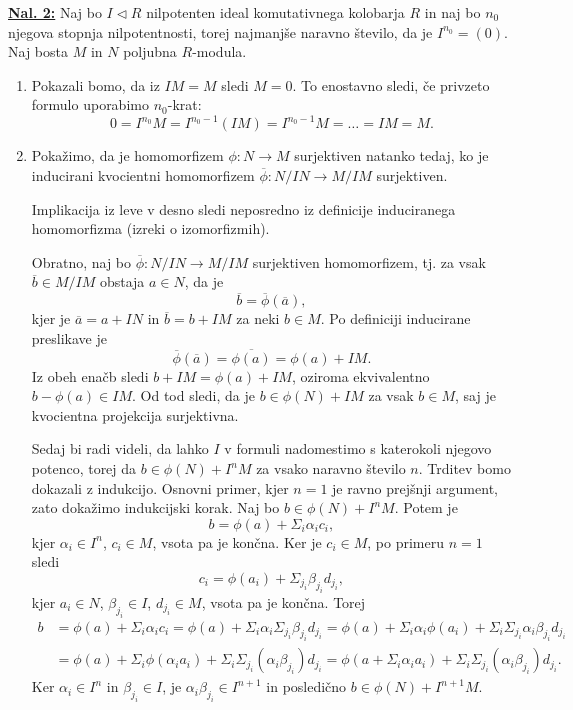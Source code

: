 \documentclass[a4paper, 12pt]{article} %
\newcommand{\subideal}{\vartriangleleft}
\begin{document}
\underline{\textbf{Nal. 2:}}
Naj bo $I \subideal R$ nilpotenten ideal komutativnega kolobarja $R$ in naj bo $n_0$ njegova stopnja nilpotentnosti, torej najmanjše naravno število, da je $I^{n_0} = (0)$. Naj bosta $M$ in $N$ poljubna $R$-modula.
\begin{enumerate}[label=(\alph*)]
	\item Pokazali bomo, da iz $IM = M$ sledi $M = 0$. To enostavno sledi, če privzeto formulo uporabimo $n_0$-krat:
	\[
	0 = I^{n_0}M = I^{n_0-1}(IM) = I^{n_0-1}M = \dots = IM = M.
	\]
	\item Pokažimo, da je homomorfizem $\phi\colon N \to M$ surjektiven natanko tedaj, ko je inducirani kvocientni homomorfizem $\overline{\phi}\colon N/IN \to M/IM$ surjektiven.
	
	Implikacija iz leve v desno sledi neposredno iz definicije induciranega homomorfizma (izreki o izomorfizmih).
	
	Obratno, naj bo $\overline{\phi} \colon N/IN \to M/IM$ surjektiven homomorfizem, tj. za vsak $\overline{b} \in M/IM$ obstaja $a \in N$, da je
	\[
	\overline{b} = \overline{\phi}(\overline{a}),
	\]
	kjer je $\overline{a} = a + IN$ in $\overline{b} = b + IM$ za neki $b \in M$. Po definiciji inducirane preslikave je
	\[
	\overline{\phi}(\overline{a}) = \overline{\phi(a)} = \phi(a) + IM.
	\]
	Iz obeh enačb sledi $b + IM = \phi(a) + IM$,
	oziroma ekvivalentno $b - \phi(a) \in IM$.
	Od tod sledi, da je $b \in \phi(N) + IM$ za vsak $b \in M$, saj je kvocientna projekcija surjektivna.
	
	Sedaj bi radi videli, da lahko $I$ v formuli nadomestimo s katerokoli njegovo potenco, torej da $b \in \phi(N) + I^nM$ za vsako naravno število $n$. Trditev bomo dokazali z indukcijo. Osnovni primer, kjer $n=1$ je ravno prejšnji argument, zato dokažimo indukcijski korak. Naj bo $b \in \phi(N) + I^nM$. Potem je
	\[
	b = \phi(a) + \Sigma_i \alpha_i c_i,
	\]
	kjer $\alpha_i \in I^n$, $c_i \in M$, vsota pa je končna.
	Ker je $c_i \in M$, po primeru $n = 1$ sledi
	\[
	c_i = \phi(a_i) + \Sigma_{j_i}\beta_{j_i}d_{j_i},
	\]
	kjer $a_i \in N$, $\beta_{j_i} \in I$, $d_{j_i} \in M$, vsota pa je končna.
	Torej
	\begin{align*}
	b &=  \phi(a) + \Sigma_i \alpha_i c_i =  \phi(a) + \Sigma_i \alpha_i \Sigma_{j_i} \beta_{j_i}d_{j_i} = \phi(a) + \Sigma_i\alpha_i\phi(a_i) + \Sigma_i \Sigma_{j_i}\alpha_i \beta_{j_i}d_{j_i} \\
	&= \phi(a) + \Sigma_i\phi(\alpha_i a_i) + \Sigma_i \Sigma_{j_i}(\alpha_i \beta_{j_i})d_{j_i} =  \phi\left( a + \Sigma_i\alpha_i a_i\right) + \Sigma_i \Sigma_{j_i}(\alpha_i \beta_{j_i})d_{j_i}.
	\end{align*}
	Ker $\alpha_i \in I^n$ in $\beta_{j_i} \in I$, je $\alpha_i\beta_{j_i} \in I^{n+1}$ in posledično $b \in \phi(N) + I^{n+1}M$.
	

\end{enumerate}
\end{document}
